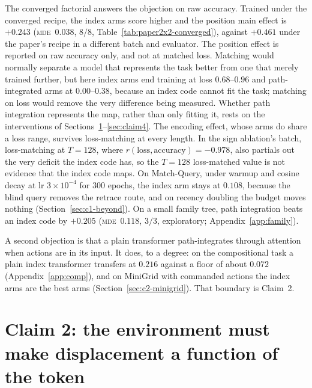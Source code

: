 \documentclass[10pt]{article}
\newcommand{\mde}{\textsc{mde}}
\begin{document}
The converged factorial answers the objection on raw accuracy. Trained under the converged recipe, the
index arms score higher and the position main effect is $+0.243$ (\mde\ $0.038$, $8/8$,
Table~\ref{tab:paper2x2-converged}), against $+0.461$ under the paper's recipe in a different batch and
evaluator. The position effect is reported on raw accuracy only, and not at matched loss. Matching would normally separate a model that represents the task better from one that merely trained further, but here index arms end training at loss $0.68$--$0.96$ and path-integrated arms at $0.00$--$0.38$, because an index code cannot fit the task; matching on loss would remove the very difference being measured. Whether path integration represents the map, rather than only fitting it, rests on the interventions of Sections~\ref{sec:claim2}--\ref{sec:claim4}. The encoding effect, whose arms do share a loss range, survives loss-matching at every length.
In the sign ablation's batch, loss-matching at $T=128$, where
$r(\text{loss},\text{accuracy})=-0.978$, also partials out the very deficit the index code has, so the
$T=128$ loss-matched value is not evidence that the index code maps. On Match-Query, under warmup and
cosine decay at lr $3\times10^{-4}$ for 300 epochs, the index arm stays at $0.108$, because the blind query removes the retrace route, and on
recency doubling the budget moves nothing (Section~\ref{sec:c1-beyond}). On a small family tree, path
integration beats an index code by $+0.205$ (\mde\ $0.118$, $3/3$, exploratory; Appendix~\ref{app:family}).

A second objection is that a plain transformer path-integrates through attention when actions are in
its input. It does, to a degree: on the compositional task a plain index transformer transfers at
$0.216$ against a floor of about $0.072$ (Appendix~\ref{app:comp}), and on MiniGrid with commanded
actions the index arms are the best arms (Section~\ref{sec:c2-minigrid}). That boundary is Claim~2.

\section{Claim 2: the environment must make displacement a function of the token}
\label{sec:claim2}
\end{document}
